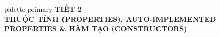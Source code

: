 \documentclass[aspectratio=169, 10pt]{beamer}
\begin{document}
\begin{frame}[plain]
  \vfill
  \centering
  \begin{beamercolorbox}[sep=8pt,center,shadow=true,rounded=true]{palette primary}
    {\Huge \textbf{TIẾT 2}}\\[2mm]
    {\Large \textbf{THUỘC TÍNH (PROPERTIES), AUTO-IMPLEMENTED PROPERTIES \& HÀM TẠO (CONSTRUCTORS)}}
  \end{beamercolorbox}
  \vfill
\end{frame}

\end{document}
